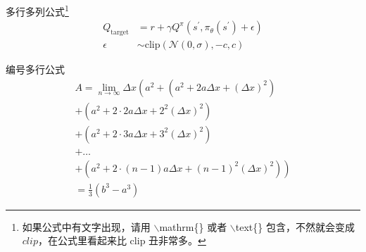 \documentclass{ctexbeamer}
\begin{document}
\begin{frame}
	\begin{exampleblock}{多行多列公式\footnote{如果公式中有文字出现，请用 $\backslash$mathrm\{\} 或者 $\backslash$text\{\} 包含，不然就会变成 $clip$，在公式里看起来比 $\mathrm{clip}$ 丑非常多。}}
		\begin{align}
			Q_\mathrm{target} & =r+\gamma Q^\pi(s^\prime, \pi_\theta(s^\prime)+\epsilon)  \\
			\epsilon          & \sim\mathrm{clip}(\mathcal{N}(0, \sigma), -c, c)\nonumber
		\end{align}
	\end{exampleblock}
\end{frame}

\begin{frame}
	\begin{exampleblock}{编号多行公式}
		\begin{multline}
			A=\lim_{n\rightarrow\infty}\Delta x\left(a^{2}+\left(a^{2}+2a\Delta x+\left(\Delta x\right)^{2}\right)\right.\label{eq:reset}\\
			+\left(a^{2}+2\cdot2a\Delta x+2^{2}\left(\Delta x\right)^{2}\right)\\
			+\left(a^{2}+2\cdot3a\Delta x+3^{2}\left(\Delta x\right)^{2}\right)\\
			+\ldots\\
			\left.+\left(a^{2}+2\cdot(n-1)a\Delta x+(n-1)^{2}\left(\Delta x\right)^{2}\right)\right)\\
			=\frac{1}{3}\left(b^{3}-a^{3}\right)
		\end{multline}
	\end{exampleblock}
\end{frame}
\end{document}
